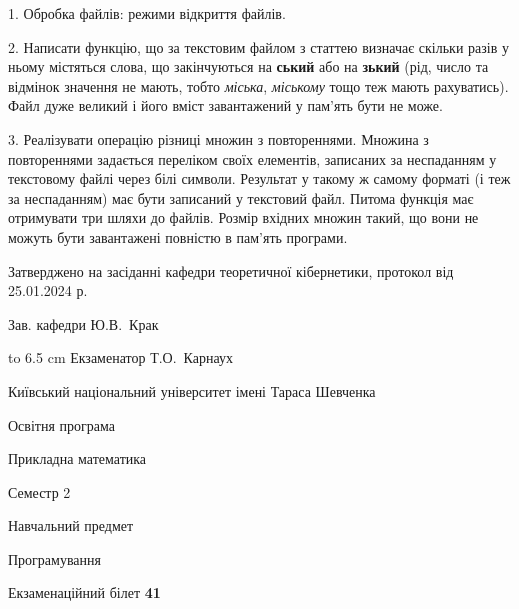 \documentclass[12pt, ukrainian]{article}
\begin{document}
{%
1. Обробка файлів: режими відкриття файлів.%
\par
2. Написати функцію, що за текстовим файлом з статтею визначає  скільки разів у ньому містяться слова, що закінчуються на \textbf{ський} або на \textbf{зький} (рід, число та відмінок значення не мають, тобто \textit{міська}, \textit{міському} тощо теж мають рахуватись). Файл дуже великий і його вміст завантажений у пам'ять бути не може.

\par
3. Реалізувати операцію різниці множин з повтореннями. Множина з повтореннями задається переліком своїх елементів, записаних за неспаданням у текстовому файлі через білі символи. Результат у такому ж самому форматі (і теж за неспаданням) має бути записаний у текстовий файл. Питома функція має отримувати три шляхи до файлів. Розмір вхідних множин такий, що вони не можуть бути завантажені повністю в пам’ять програми.

}
{\smallskip\smallskip \begin {scriptsize} Затверджено на засіданні кафедри теоретичної кібернетики, протокол   від   25.01.2024 р.\par\smallskip\smallskip\smallskip\smallskip
{\parbox {6.5 cm} {Зав. кафедри \dotfill Ю.В.~Крак}}\hspace {0.7cm} {\hbox to 6.5 cm { Екзаменатор \dotfill Т.О.~Карнаух}} \end{scriptsize}}
\vspace{0.9cm}
{{\begin {scriptsize}\par
{ \center  Київський національний університет імені Тараса Шевченка \par}
{\parbox {5 cm}{Освітня програма \hfill}{\parbox {7 cm}{Прикладна математика\hfill}}\parbox {6 cm}{\hfill Семестр 2}}\par
{\parbox {5 cm} {Навчальний предмет \hfill}\parbox {7 cm}{Програмування \hfill}\parbox {6cm}{\hfill}\par}\vspace{-15pt} \end{scriptsize}}{\center Екзаменаційний білет \No \textbf { 41 }\par}}
\end{document}
